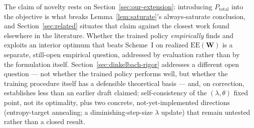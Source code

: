 \documentclass[11pt]{article}
\begin{document}
The claim of novelty rests on Section~\ref{sec:our-extension}: introducing
$P_{\text{total}}$ into the objective is what breaks
Lemma~\ref{lem:saturate}'s always-saturate conclusion, and Section~\ref{sec:related}
situates that claim against the closest work found elsewhere in the
literature. Whether the trained policy \emph{empirically} finds and exploits
an interior optimum that beats Scheme~I on realized $\mathrm{EE}(\mathbf{W})$
is a separate, still-open empirical question, addressed by evaluation rather
than by the formulation itself. Section~\ref{sec:dinkelbach-rigor} addresses
a different open question --- not whether the trained policy performs well,
but whether the training procedure itself has a defensible theoretical basis
--- and, on correction, establishes less than an earlier draft claimed:
self-consistency of the $(\lambda,\theta)$ fixed point, not its optimality,
plus two concrete, not-yet-implemented directions (entropy-target annealing;
a diminishing-step-size $\lambda$ update) that remain untested rather than
a closed result.
\end{document}
